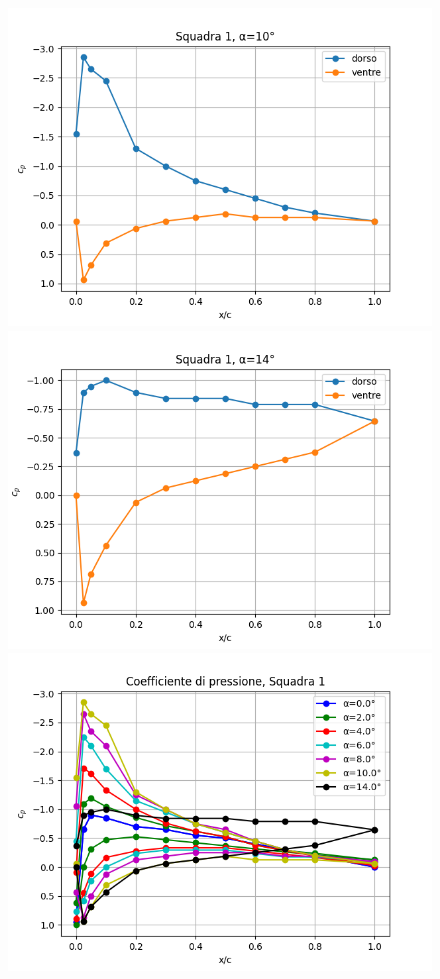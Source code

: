 \begin{figure}[H]
    \includegraphics[width=.49\textwidth]{images/5/cp1 a=10.png}
    \includegraphics[width=.49\textwidth]{images/5/cp1 a=14.png}
    \includegraphics[width=.49\textwidth]{images/5/cp1.png}
\end{figure}
